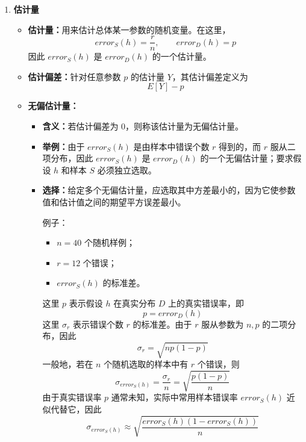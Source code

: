 \documentclass[../main.tex]{subfiles}
\begin{document}
\begin{enumerate}
    \item \textbf{估计量}
    \begin{itemize}
        \item \textbf{估计量：}用来估计总体某一参数的随机变量。在这里，
        $$
        error_S(h)=\frac{r}{n},\qquad error_D(h)=p
        $$
        因此 $error_S(h)$ 是 $error_D(h)$ 的一个估计量。
        \item \textbf{估计偏差：}针对任意参数 $p$ 的估计量 $Y$，其估计偏差定义为
        $$
        E[Y]-p
        $$
        \item \textbf{无偏估计量：}
        \begin{itemize}
            \item \textbf{含义：}若估计偏差为 $0$，则称该估计量为无偏估计量。
            \item \textbf{举例：}由于 $error_S(h)$ 是由样本中错误个数 $r$ 得到的，而 $r$ 服从二项分布，因此 $error_S(h)$ 是 $error_D(h)$ 的一个无偏估计量；要求假设 $h$ 和样本 $S$ 必须独立选取。
            \item \textbf{选择：}给定多个无偏估计量，应选取其中方差最小的，因为它使参数值和估计值之间的期望平方误差最小。
            
            {\small\kaishu
            例子：
            \begin{itemize}
                \item $n=40$ 个随机样例；
                \item $r=12$ 个错误；
                \item $error_S(h)$ 的标准差。
            \end{itemize}
            这里 $p$ 表示假设 $h$ 在真实分布 $D$ 上的真实错误率，即
            $$
            p=error_D(h)
            $$
            这里 $\sigma_r$ 表示错误个数 $r$ 的标准差。由于 $r$ 服从参数为 $n,p$ 的二项分布，因此
            $$
            \sigma_r=\sqrt{np(1-p)}
            $$
            一般地，若在 $n$ 个随机选取的样本中有 $r$ 个错误，则
            $$
            \sigma_{error_S(h)}=\frac{\sigma_r}{n}=\sqrt{\frac{p(1-p)}{n}}
            $$
            由于真实错误率 $p$ 通常未知，实际中常用样本错误率 $error_S(h)$ 近似代替它，因此
            $$
            \sigma_{error_S(h)}\approx \sqrt{\frac{error_S(h)\left(1-error_S(h)\right)}{n}}
            $$
            }
        \end{itemize}
    \end{itemize}


\end{enumerate}
\end{document}
